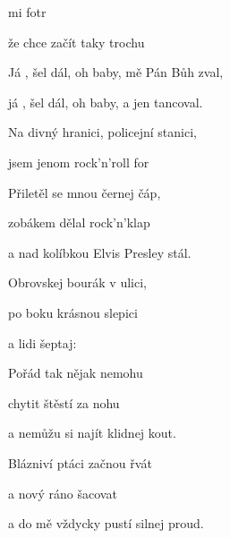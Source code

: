 

\zs
{} mi fotr 


že  chce začít taky trochu 

\ks

\zr
Já , šel dál, oh baby,  mě Pán Bůh zval,

já , šel dál, oh baby, a  jen tancoval.

Na  divný hranici,  policejní stanici,

 jsem jenom rock'n'roll for 
\kr

\zs
Přiletěl se mnou černej čáp,

zobákem dělal rock'n'klap

a nad kolíbkou Elvis Presley stál.

Obrovskej bourák v ulici,

po boku krásnou slepici

a lidi šeptaj: 
\ks

\zr  \kr

\zs
Pořád tak nějak nemohu

chytit štěstí za nohu

a nemůžu si najít klidnej kout.

Blázniví ptáci začnou řvát

a nový ráno šacovat

a do mě vždycky pustí silnej proud.
\ks

\zr  \kr

\kp





